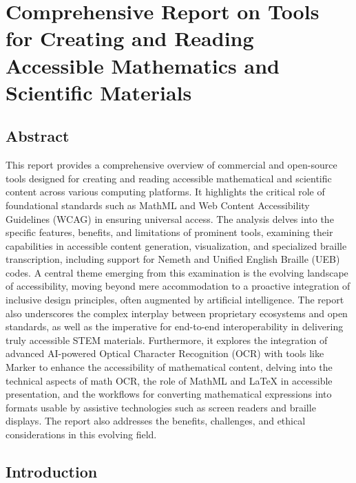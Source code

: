 \chapter{Comprehensive Report on Tools for Creating and Reading Accessible Mathematics and Scientific Materials}\label{chap:accessible-math-tools}
\author{A PhD Researcher in AI and Accessibility Technologies}
\section{Abstract}\label{sec:abstract}
This report provides a comprehensive overview of commercial and open-source tools designed for creating and reading accessible mathematical and scientific content across various computing platforms. It highlights the critical role of foundational standards such as MathML and Web Content Accessibility Guidelines (WCAG) in ensuring universal access. The analysis delves into the specific features, benefits, and limitations of prominent tools, examining their capabilities in accessible content generation, visualization, and specialized braille transcription, including support for Nemeth and Unified English Braille (UEB) codes. A central theme emerging from this examination is the evolving landscape of accessibility, moving beyond mere accommodation to a proactive integration of inclusive design principles, often augmented by artificial intelligence. The report also underscores the complex interplay between proprietary ecosystems and open standards, as well as the imperative for end-to-end interoperability in delivering truly accessible STEM materials. Furthermore, it explores the integration of advanced AI-powered Optical Character Recognition (OCR) with tools like Marker to enhance the accessibility of mathematical content, delving into the technical aspects of math OCR, the role of MathML and LaTeX in accessible presentation, and the workflows for converting mathematical expressions into formats usable by assistive technologies such as screen readers and braille displays. The report also addresses the benefits, challenges, and ethical considerations in this evolving field.



\section{Introduction}\label{sec:intro}
